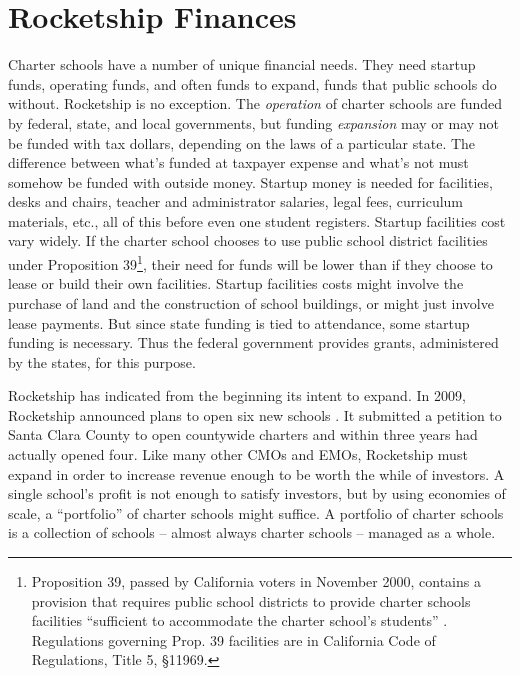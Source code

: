 \section{Rocketship Finances}\label{sec:rocketship-finances}\indent

Charter schools have a number of unique financial needs. They need startup funds, operating funds, and often funds to expand, funds that public schools do without. Rocketship is no exception. The \textit{operation} of charter schools are funded by federal, state, and local governments, but funding \textit{expansion} may or may not be funded with tax dollars, depending on the laws of a particular state. The difference between what's funded at taxpayer expense and what's not must somehow be funded with outside money. Startup money is needed for facilities, desks and chairs, teacher and administrator salaries, legal fees, curriculum materials, etc., all of this before even one student registers. Startup facilities cost vary widely. If the charter school chooses to use public school district facilities under Proposition 39\footnote{Proposition 39, passed by California voters in November 2000, contains a provision that requires public school districts to provide charter schools facilities ``sufficient to accommodate the charter school’s students'' \parencite[38—41]{sos.ca2000} \parencite{Prop39.2000}. Regulations governing Prop. 39 facilities are in California Code of Regulations, Title 5, §11969.}, their need for funds will be lower than if they choose to lease or build their own facilities. Startup facilities costs might involve the purchase of land and the construction of school buildings, or might just involve lease payments. But since state funding is tied to attendance, some startup funding is necessary. Thus the federal government provides grants, administered by the states, for this purpose.

Rocketship has indicated from the beginning its intent to expand. In 2009, Rocketship announced plans to open six new schools \parencite{Cook2009}. It submitted a petition to Santa Clara County to open countywide charters and within three years had actually opened four. Like many other CMOs and EMOs, Rocketship must expand in order to increase revenue enough to be worth the while of investors. A single school's profit is not enough to satisfy investors, but by using economies of scale, a ``portfolio'' of charter schools might suffice. A portfolio of charter schools is a collection of schools – almost always charter schools – managed as a whole.

